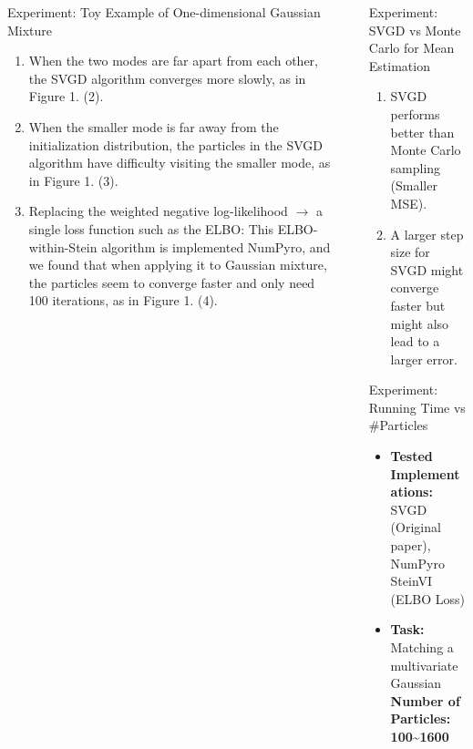 \documentclass[final]{beamer}
\newlength{\sepwidth}
\newlength{\colwidth}
\newcommand{\separatorcolumn}{\begin{column}{\sepwidth}\end{column}}
\begin{document}
\begin{frame}[t]
\begin{columns}[t]
\begin{column}{\colwidth}
\begin{block}{Experiment: Toy Example of One-dimensional Gaussian Mixture}
    \begin{enumerate}
        \item When the two modes are far apart from each other, the SVGD algorithm converges more slowly, as in Figure 1. (2).
        \item When the smaller mode is far away from the initialization distribution, the particles in the SVGD algorithm have difficulty visiting the smaller mode, as in Figure 1. (3).
        \item Replacing the weighted negative log-likelihood $\rightarrow$ a single loss function such as the ELBO: This ELBO-within-Stein algorithm is implemented NumPyro, and we found that when applying it to Gaussian mixture, the particles seem to converge faster and only need 100 iterations, as in Figure 1. (4). 
    \end{enumerate}
  \end{block}
  


\end{column}

\separatorcolumn

\begin{column}{\colwidth}

    


\begin{block}{Experiment: SVGD vs Monte Carlo for Mean Estimation}
    \begin{enumerate}
    \item SVGD performs better than Monte Carlo sampling (Smaller MSE).
    \item A larger step size for SVGD might converge faster but might also lead to a larger error.
    \end{enumerate}
    
\end{block}

  \begin{block}{Experiment: Running Time vs \#Particles}

    \begin{itemize}
     \item \textbf{Tested Implementations:} SVGD (Original paper), NumPyro SteinVI (ELBO Loss)
     \item \textbf{Task:} Matching a multivariate Gaussian \quad  \textbf{Number of Particles: 100\sim 1600}
    \end{itemize}
     
  \end{block}


\end{column}
\end{columns}
\end{frame}
\end{document}
